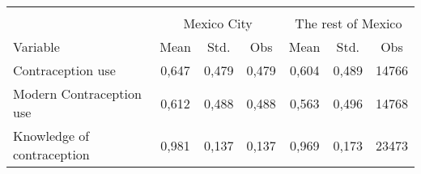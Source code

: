 

\begin{tabular}{lcccccc}
	\hline\hline
	&		&		&		&		&		&	 	\\
	\multirow{1}{*}{} &
	\multicolumn{3}{c}{Mexico City}&\multicolumn{3}{c}{The rest of Mexico}\\ \cmidrule(r){2-4} \cmidrule(l){5-7}


Variable	&	Mean	&	Std.	&	Obs	&	Mean	&	Std.	&	Obs	\\\hline


Contraception use	&	0,647	&	0,479	&	0,479	&	0,604	&	0,489	&	14766	\\
Modern Contraception use	&	0,612	&	0,488	&	0,488	&	0,563	&	0,496	&	14768	\\
Knowledge of contraception	&	0,981	&	0,137	&	0,137	&	0,969	&	0,173	&	23473	\\





\hline\hline
\end{tabular}